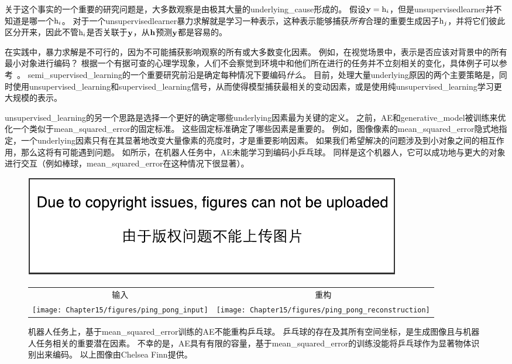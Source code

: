 
关于这个事实的一个重要的研究问题是，大多数观察是由极其大量的\gls{underlying_cause}形成的。
假设$\mathbf{y} = \mathrm{h}_i$，但是\gls{unsupervised}\gls{learner}并不知道是哪一个$\mathrm{h}_i$。
对于一个\gls{unsupervised}\gls{learner}暴力求解就是学习一种表示，这种表示能够捕获\emph{所有}合理的重要生成因子$\mathrm{h}_j$，并将它们彼此区分开来，因此不管$\mathrm{h}_i$是否关联于$\mathbf{y}$，从$\mathbf{h}$预测$\mathbf{y}$都是容易的。


在实践中，暴力求解是不可行的，因为不可能捕获影响观察的所有或大多数变化因素。
例如，在视觉场景中，表示是否应该对背景中的所有最小对象进行编码？
根据一个有据可查的心理学现象，人们不会察觉到环境中和他们所在进行的任务并不立刻相关的变化，具体例子可以参考~\cite{simons1998failure}。
\gls{semi_supervised_learning}的一个重要研究前沿是确定每种情况下要编码\emph{什么}。
目前，处理大量\gls{underlying}原因的两个主要策略是，同时使用\gls{unsupervised_learning}和\gls{supervised_learning}信号，从而使得模型捕获最相关的变动因素，或是使用纯\gls{unsupervised_learning}学习更大规模的表示。


\gls{unsupervised_learning}的另一个思路是选择一个更好的确定哪些\gls{underlying}因素最为关键的定义。
之前，\gls{AE}和\gls{generative_model}被训练来优化一个类似于\gls{mean_squared_error}的固定标准。
这些固定标准确定了哪些因素是重要的。
例如，图像像素的\gls{mean_squared_error}隐式地指定，一个\gls{underlying}因素只有在其显著地改变大量像素的亮度时，才是重要影响因素。
如果我们希望解决的问题涉及到小对象之间的相互作用，那么这将有可能遇到问题。
如所示，在机器人任务中，\gls{AE}未能学习到编码小乒乓球。
同样是这个机器人，它可以成功地与更大的对象进行交互（例如棒球，\gls{mean_squared_error}在这种情况下很显著）。



\begin{figure}[!htb]
\ifOpenSource
\centerline{\includegraphics{figure.pdf}}
\else
\begin{tabular}{cc}
输入 & 重构 \\
\texttt{[image: Chapter15/figures/ping\_pong\_input]} &
\texttt{[image: Chapter15/figures/ping\_pong\_reconstruction]}
\end{tabular}
\fi
\caption{机器人任务上，基于\gls{mean_squared_error}训练的\gls{AE}不能重构乒乓球。
乒乓球的存在及其所有空间坐标，是生成图像且与机器人任务相关的重要潜在因素。
不幸的是，\gls{AE}具有有限的容量，基于\gls{mean_squared_error}的训练没能将乒乓球作为显著物体识别出来编码。
以上图像由Chelsea Finn提供。
}
\label{fig:chap15_pingpong}
\end{figure}

